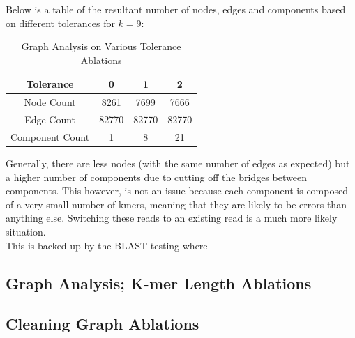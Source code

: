 \documentclass[10pt]{article}
\begin{document}
Below is a table of the resultant number of nodes, edges and components based on different tolerances for $k=9$:\\
\begin{table}[h]
\centering
\begin{tabular}{c|ccc}
Tolerance & 0 & 1 & 2 \\ \hline
Node Count & 8261 & 7699 & 7666 \\
\hline
Edge Count & 82770 & 82770 & 82770 \\
\hline
Component Count & 1 & 8 & 21
\end{tabular}
\caption{Graph Analysis on Various Tolerance Ablations}
\end{table}

Generally, there are less nodes (with the same number of edges as expected) but a higher number of components due to cutting off the bridges between components. This however, is not an issue because each component is composed of a very small number of kmers, meaning that they are likely to be errors than anything else. Switching these reads to an existing read is a much more likely situation.\\

This is backed up by the BLAST testing where

\subsection*{Graph Analysis; K-mer Length Ablations}

\subsection*{Cleaning Graph Ablations}
\end{document}
